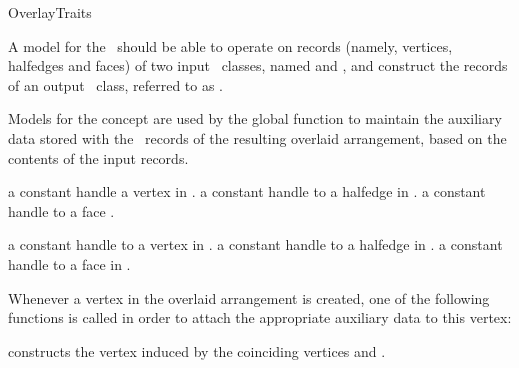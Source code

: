 
\ccRefPageBegin

\begin{ccRefConcept}{OverlayTraits}

A model for the \ccRefName\ should be able to operate on records (namely,
vertices, halfedges and faces) of two input \dcel\ classes, named
 and , and construct the records of an output \dcel\
class, referred to as .

Models for the concept are used by the global  function to
maintain the auxiliary data stored with the \dcel\ records of the resulting
overlaid arrangement, based on the contents of the input records.

\ccTypes

{a constant handle a vertex in .}
\ccGlue
{}
{a constant handle to a halfedge in .}
\ccGlue
{}
{a constant handle to a face .}

{a constant handle to a vertex in .}
\ccGlue
{}
{a constant handle to a halfedge in .}
\ccGlue
{}
{a constant handle to a face in .}

\ccGlue
{}
\ccGlue
{}



Whenever a vertex in the overlaid arrangement is created, one of the
following functions is called in order to attach the appropriate
auxiliary data to this vertex:
    
    {constructs the vertex  induced by the coinciding vertices 
     \ccc{v1} and \ccc{v2}.}


\end{ccRefConcept}
